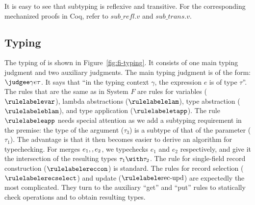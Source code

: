 


It is easy to see that subtyping is reflexive and transitive. For the
corresponding mechanized proofs in Coq, refer to $sub\_refl.v$ and
$sub\_trans.v$.

\subsection{Typing}

\begin{figure*}
  
  \caption{The type system of \name.}
  \label{fig:fi-typing}
\end{figure*}

The typing of \name is shown in Figure~\ref{fig:fi-typing}. It consists of one
main typing judgment and two auxiliary judgments. The main typing judgment is of
the form: $ \judgee \gamma e \tau $. It says that ``in the typing context
$\gamma$, the expression $e$ is of type $\tau$''. The rules that are the same as
in System $F$ are rules for variables ($\rulelabelevar$), lambda abstractions
($\rulelabelelam$), type abstraction ($\rulelabeleblam$), and type application
($\rulelabeletapp$). The rule $\rulelabeleapp$ needs special attention as we add
a subtyping requirement in the premise: the type of the argument ($\tau_3$) is a
subtype of that of the parameter ($\tau_1$). The advantage is that it then
becomes easier to derive an algorithm for typechecking. For merges
$e_1 ,, e_2$, we typechecks $e_1$ and $e_2$ respectively, and give it the
intersection of the resulting types $\tau_1 \andop \tau_2$. The rule for
single-field record construction ($\rulelabelereccon$) is standard. The rules
for record selection ($\rulelabelerecselect$) and update ($\rulelabelerecupd$) are
expectedly the most complicated. They turn to the auxiliary ``get'' and ``put''
rules to statically check operations and to obtain resulting types.

